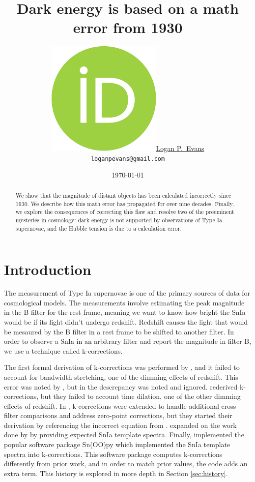 \documentclass{article}
\title{Dark energy is based on a math error from 1930}
\date{\today}
\author{
  \href{https://orcid.org/0000-0001-6450-3262}{\includegraphics[scale=0.06]{orcid.pdf}\hspace{1mm}Logan P.~Evans}
  \\ \texttt{loganpevans@gmail.com}
}
\begin{document}
\maketitle

\begin{abstract}
  We show that the magnitude of distant objects has been calculated incorrectly
  since 1930. We describe how this math error has propagated for over nine
  decades. Finally, we explore the consequences of correcting this flaw and
  resolve two of the preeminent mysteries in cosmology: dark energy is not
  supported by observations of Type Ia supernovae, and the Hubble tension is
  due to a calculation error.
\end{abstract}


\section{Introduction}

The measurement of Type Ia supernovae is one of the primary sources of data for
cosmological models. The measurements involve estimating the peak magnitude in
the B filter \citet{riess1998} for the rest frame, meaning we want to know how
bright the SnIa would be if its light didn't undergo redshift. Redshift causes
the light that would be mesaured by the B filter in a rest frame to be shifted
to another filter. In order to observe a SnIa in an arbitrary filter and report
the magnitude in filter B, we use a technique called k-corrections.

The first formal derivation of k-corrections was performed by
\citet{tollman1930}, and it failed to account for bandwidth stretching, one of
the dimming effects of redshift. This error was noted by \citet{desitter1934},
but in \citet{hubble1935} the descrepancy was noted and ignored.
\citet{oke1968} rederived k-corrections, but they failed to account time
dilation, one of the other dimming effects of redshift. In \citet{kim1996},
k-corrections were extended to handle additional cross-filter comparisons and
address zero-point corrections, but they started their derivation by
referencing the incorrect equation from \citet{oke1968}. \citet{hsiao2007}
expanded on the work done by \citet{kim1996} by providing expected SnIa
template spectra.  Finally, \citet{burns2010} implemented the popular software
package Sn(OO)py which implemented the SnIa template spectra into
k-corrections. This software package computes k-corrections differently from
prior work, and in order to match prior values, the code adds an extra term.
This history is explored in more depth in Section \ref{sec:history}.
\end{document}
